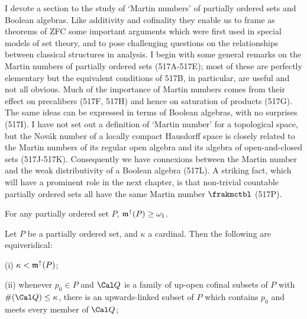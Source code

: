 

\def\chaptername{Cardinal functions}
\def\sectionname{Martin numbers}


I devote a section to the study of `Martin numbers' of partially ordered
sets and Boolean algebras.   Like additivity and cofinality they
enable us to frame as theorems of ZFC some important arguments which
were first used in special models of set theory, and to pose 
challenging questions on the relationships between classical structures
in analysis.   I begin with some general remarks on the Martin numbers
of partially ordered sets (517A-517E);  %
most of these are perfectly elementary but the equivalent conditions of
517B, in particular, are useful and not all obvious.   Much of the
importance of Martin numbers comes from their effect on precalibers
(517F, 517H) and hence on saturation of products (517G).   The same
ideas can be expressed in terms of Boolean algebras, with no surprises
(517I).   I have not set out a definition of `Martin number' for a
topological space, but the Nov\'ak number of a locally compact Hausdorff
space is closely related to the Martin numbers of its regular open
algebra and its algebra of open-and-closed sets (517J-517K).
Consequently we have connexions between the Martin number and the weak
distributivity of a Boolean algebra (517L).   A striking fact, which
will have a prominent role in the next chapter, is that
non-trivial countable partially ordered sets all have the same Martin
number $\frakmctbl$ (517P).

 For any partially ordered set $P$,
$\frak m^{\uparrow}(P)\ge\omega_1$.


Let $P$ be a partially ordered set, and $\kappa$ a
cardinal.   Then the following are equiveridical:

(i) $\kappa<\frak m^{\uparrow}(P)$;

(ii) whenever $p_0\in P$ and $\Cal Q$ is a family of up-open cofinal
subsets of $P$ with $\#(\Cal Q)\le\kappa$, there is an upwards-linked
subset of $P$ which contains $p_0$ and meets every member of $\Cal Q$;

